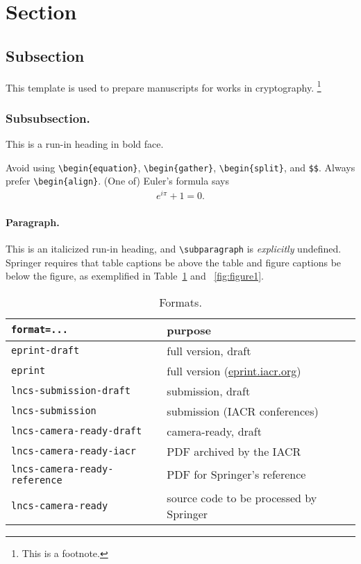 \section{Section}

\subsection{Subsection}

This template is used to prepare manuscripts for works in cryptography.%
\footnote{This is a footnote.}

\subsubsection{Subsubsection.}
This is a run-in heading in bold face.

Avoid using \texttt{\textbackslash begin\{equation\}},
\texttt{\textbackslash begin\{gather\}},
\texttt{\textbackslash begin\{split\}},
and \texttt{\$\$}.
Always prefer \texttt{\textbackslash begin\{align\}}.
(One of) Euler's formula says
\begin{align*}
e^{i\pi}+1=0.
\end{align*}

\paragraph{Paragraph.}
This is an italicized run-in heading, and
\texttt{\textbackslash subparagraph} is \emph{explicitly} undefined.
Springer requires that table captions be above the table
and figure captions be below the figure,
as exemplified in Table~\ref{tab:table1} and \Figure~\ref{fig:figure1}.

\begin{table}[h]
\centering
\capstart
\caption{Formats.}
\label{tab:table1}
\begin{tabular}{ll}
\toprule
\texttt{format=...} & \textbf{purpose} \\
\midrule
\texttt{eprint-draft} & full version, draft \\
\texttt{eprint} &
full version (\href{https://eprint.iacr.org/}{eprint.iacr.org}) \\
\texttt{lncs-submission-draft} &
submission, draft \\
\texttt{lncs-submission} &
submission (IACR conferences) \\
\texttt{lncs-camera-ready-draft} &
camera-ready, draft \\
\texttt{lncs-camera-ready-iacr} &
PDF archived by the IACR \\
\texttt{lncs-camera-ready-reference} &
PDF for Springer's reference \\
\texttt{lncs-camera-ready} &
source code to be processed by Springer \\
\bottomrule
\end{tabular}
\end{table}

